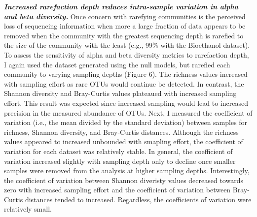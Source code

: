 \documentclass[
]{article}
\begin{document}
\textbf{\emph{Increased rarefaction depth reduces intra-sample variation
in alpha and beta diversity.}} Once concern with rarefying communities
is the perceived loss of sequencing information when more a large
fraction of data appears to be removed when the community with the
greatest sequencing depth is rarefied to the size of the community with
the least (e.g., 99\% with the Bioethanol dataset). To assess the
sensitivity of alpha and beta diversity metrics to rarefaction depth, I
again used the dataset generated using the null models, but rarefied
each community to varying sampling depths (Figure 6). The richness
values increased with sampling effort as rare OTUs would continue be
detected. In contrast, the Shannon diversity and Bray-Curtis values
plateaued with increased sampling effort. This result was expected since
increased sampling would lead to increased precision in the measured
abundance of OTUs. Next, I measured the coefficient of variation (i.e.,
the mean divided by the standard deviation) between samples for
richness, Shannon diversity, and Bray-Curtis distances. Although the
richness values appeared to increased unbounded with smapling effort,
the coefficient of variation for each dataset was relatively stable. In
general, the coefficient of variation increased slightly with sampling
depth only to decline once smaller samples were removed from the
analysis at higher sampling depths. Interestingly, the coefficient of
variation between Shannon diveristy values decreased towards zero with
increased sampling effort and the coefficient of variation between
Bray-Curtis distances tended to increased. Regardless, the coefficients
of variation were relatively small.
\end{document}
